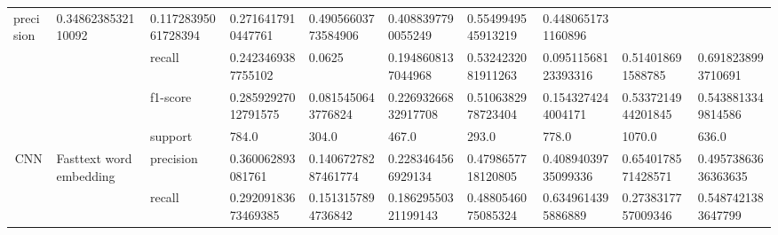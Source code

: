 \begin{table}[h!]
{\begin{tabular}{@{}clllllllll@{}}
  \multicolumn{1}{l|}{precision} &
  \multicolumn{1}{l|}{0.3486238532110092} &
  \multicolumn{1}{l|}{0.11728395061728394} &
  \multicolumn{1}{l|}{0.2716417910447761} &
  \multicolumn{1}{l|}{0.49056603773584906} &
  \multicolumn{1}{l|}{0.4088397790055249} &
  \multicolumn{1}{l|}{0.5549949545913219} &
  \multicolumn{1}{l|}{0.4480651731160896} \\ \cmidrule(l){3-10} 
\multicolumn{1}{|l|}{} &
  \multicolumn{1}{l|}{} &
  \multicolumn{1}{l|}{recall} &
  \multicolumn{1}{l|}{0.2423469387755102} &
  \multicolumn{1}{l|}{0.0625} &
  \multicolumn{1}{l|}{0.1948608137044968} &
  \multicolumn{1}{l|}{0.5324232081911263} &
  \multicolumn{1}{l|}{0.09511568123393316} &
  \multicolumn{1}{l|}{0.514018691588785} &
  \multicolumn{1}{l|}{0.6918238993710691} \\ \cmidrule(l){3-10} 
\multicolumn{1}{|l|}{} &
  \multicolumn{1}{l|}{} &
  \multicolumn{1}{l|}{f1-score} &
  \multicolumn{1}{l|}{0.28592927012791575} &
  \multicolumn{1}{l|}{0.0815450643776824} &
  \multicolumn{1}{l|}{0.22693266832917708} &
  \multicolumn{1}{l|}{0.5106382978723404} &
  \multicolumn{1}{l|}{0.1543274244004171} &
  \multicolumn{1}{l|}{0.5337214944201845} &
  \multicolumn{1}{l|}{0.5438813349814586} \\ \cmidrule(l){3-10} 
\multicolumn{1}{|l|}{} &
  \multicolumn{1}{l|}{} &
  \multicolumn{1}{l|}{support} &
  \multicolumn{1}{l|}{784.0} &
  \multicolumn{1}{l|}{304.0} &
  \multicolumn{1}{l|}{467.0} &
  \multicolumn{1}{l|}{293.0} &
  \multicolumn{1}{l|}{778.0} &
  \multicolumn{1}{l|}{1070.0} &
  \multicolumn{1}{l|}{636.0} \\ \midrule
\multicolumn{1}{|c|}{\multirow{4}{*}{CNN}} &
  \multicolumn{1}{l|}{\multirow{4}{*}{Fasttext word embedding}} &
  \multicolumn{1}{l|}{precision} &
  \multicolumn{1}{l|}{0.360062893081761} &
  \multicolumn{1}{l|}{0.14067278287461774} &
  \multicolumn{1}{l|}{0.2283464566929134} &
  \multicolumn{1}{l|}{0.4798657718120805} &
  \multicolumn{1}{l|}{0.40894039735099336} &
  \multicolumn{1}{l|}{0.6540178571428571} &
  \multicolumn{1}{l|}{0.49573863636363635} \\ \cmidrule(l){3-10} 
\multicolumn{1}{|c|}{} &
  \multicolumn{1}{l|}{} &
  \multicolumn{1}{l|}{recall} &
  \multicolumn{1}{l|}{0.29209183673469385} &
  \multicolumn{1}{l|}{0.1513157894736842} &
  \multicolumn{1}{l|}{0.18629550321199143} &
  \multicolumn{1}{l|}{0.4880546075085324} &
  \multicolumn{1}{l|}{0.6349614395886889} &
  \multicolumn{1}{l|}{0.2738317757009346} &
  \multicolumn{1}{l|}{0.5487421383647799} \\ \cmidrule(l){3-10} 

\end{tabular}}
\end{table}
